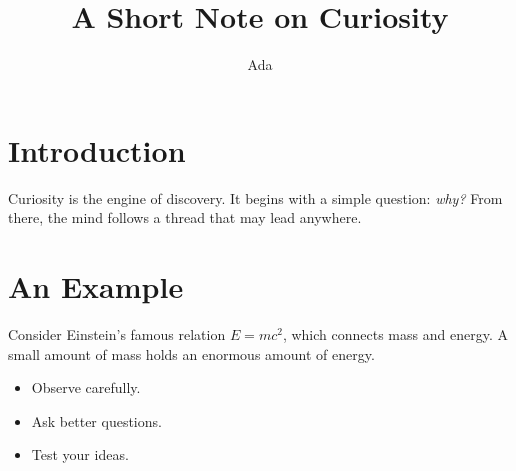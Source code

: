 \documentclass{article}
\title{A Short Note on Curiosity}
\author{Ada}
\begin{document}
\maketitle

\section{Introduction}
Curiosity is the engine of discovery. It begins with a simple question:
\emph{why?} From there, the mind follows a thread that may lead anywhere.

\section{An Example}
Consider Einstein's famous relation $E = mc^2$, which connects mass and energy.
A small amount of mass holds an enormous amount of energy.

\begin{itemize}
  \item Observe carefully.
  \item Ask better questions.
  \item Test your ideas.
\end{itemize}
\end{document}
